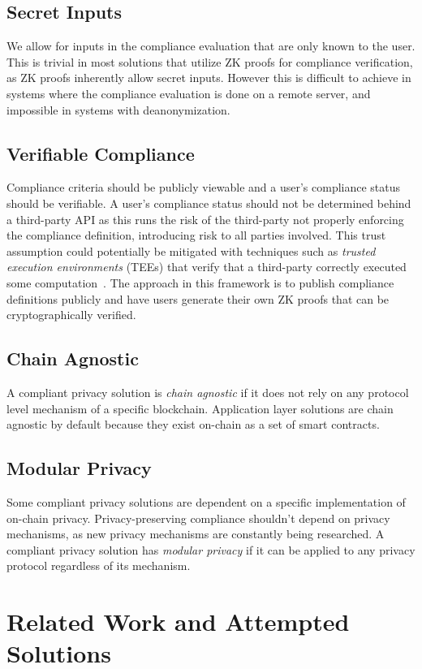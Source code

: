 \documentclass[9pt]{extreport}
\begin{document}
\section{Secret Inputs} We allow for inputs in the compliance evaluation that are only known to the user.  This is trivial in most solutions that utilize ZK proofs for compliance verification, as ZK proofs inherently allow secret inputs.  However this is difficult to achieve in systems where the compliance evaluation is done on a remote server, and impossible in systems with deanonymization.

\section{Verifiable Compliance} Compliance criteria should be publicly viewable and a user's compliance status should be verifiable.  A user's compliance status should not be determined behind a third-party API as this runs the risk of the third-party not properly enforcing the compliance definition, introducing risk to all parties involved.  This trust assumption could potentially be mitigated with techniques such as \textit{trusted execution environments} (TEEs) that verify that a third-party correctly executed some computation~\cite{haventee}.  The approach in this framework is to publish compliance definitions publicly and have users generate their own ZK proofs that can be cryptographically verified.

\section{Chain Agnostic} A compliant privacy solution is \textit{chain agnostic} if it does not rely on any protocol level mechanism of a specific blockchain.  Application layer solutions are chain agnostic by default because they exist on-chain as a set of smart contracts.

\section{Modular Privacy} Some compliant privacy solutions are dependent on a specific implementation of on-chain privacy.  Privacy-preserving compliance shouldn't depend on privacy mechanisms, as new privacy mechanisms are constantly being researched.  A compliant privacy solution has \textit{modular privacy} if it can be applied to any privacy protocol regardless of its mechanism.

\chapter{Related Work and Attempted Solutions}
\label{sec:related-work}
\end{document}
